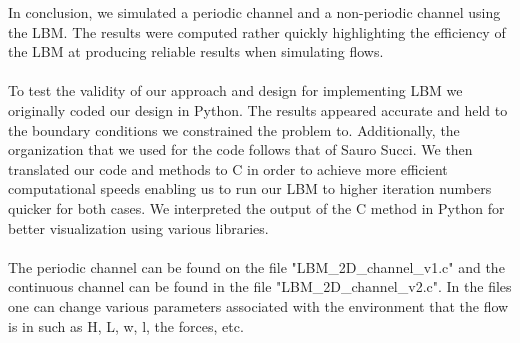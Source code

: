 \begin{solution}
In conclusion, we simulated a periodic channel and a non-periodic channel using the LBM. The results were computed rather quickly   highlighting the efficiency of the LBM at producing reliable results when simulating flows.\\
\\
To test the validity of our approach and design for implementing LBM we originally coded our design in Python. The results appeared accurate and held to the boundary conditions we constrained the problem to. Additionally, the organization that we used for the code follows that of Sauro Succi. We then translated our code and methods to C in order to achieve more efficient computational speeds enabling us to run our LBM to higher iteration numbers quicker for both cases. We interpreted the output of the C method in Python for better visualization using various libraries. \\
\\
The periodic channel can be found on the file "LBM\_2D\_channel\_v1.c" and the continuous channel can be found in the file "LBM\_2D\_channel\_v2.c". In the files one can change various parameters associated with the environment that the flow is in such as H, L, w, l, the forces, etc. 
\end{solution}